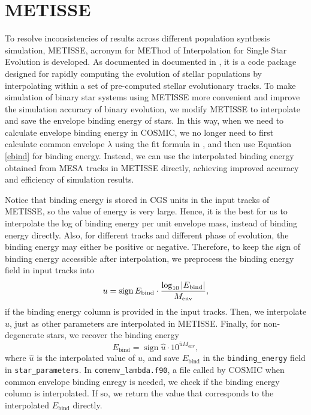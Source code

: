 \documentclass[12pt]{article}
\newcommand{\Ebind}{E_{\mathrm{bind}}}
\newcommand{\Menv}{M_{\mathrm{env}}}
\DeclareMathOperator{\sgn}{sign}
\begin{document}
\section{METISSE} \label{sec:metisse}
To resolve inconsistencies of results across different population synthesis simulation, METISSE, acronym for METhod of Interpolation for Single Star Evolution is developed. As documented in documented in \cite{Agrawal_2020,Agrawal_2023}, it is a code package designed for rapidly computing the evolution of stellar populations by interpolating within a set of pre-computed stellar evolutionary tracks. To make simulation of binary star systems using METISSE more convenient and improve the simulation accuracy of binary evolution, we modify METISSE to interpolate and save the envelope binding energy of stars. In this way, when we need to calculate envelope binding energy in COSMIC, we no longer need to first calculate common envelope $\lambda$ using the fit formula in \cite{claeys2014theoretical}, and then use Equation \ref{ebind} for binding energy. Instead, we can use the interpolated binding energy obtained from MESA tracks in METISSE directly, achieving improved accuracy and efficiency of simulation results.

Notice that binding energy is stored in CGS units in the input tracks of METISSE, so the value of energy is very large. Hence, it is the best for us to interpolate the log of binding energy per unit envelope mass, instead of binding energy directly. Also, for different tracks and different phase of evolution, the binding energy may either be positive or negative. Therefore, to keep the sign of binding energy accessible after interpolation, we preprocess the binding energy field in input tracks into
\begin{equation}
  u = \sgn{\Ebind} \cdot \frac{\log_{10} \abs{\Ebind}}{\Menv},
\end{equation}
if the binding energy column is provided in the input tracks. Then, we interpolate $u$, just as other parameters are interpolated in METISSE. Finally, for non-degenerate stars, we recover the binding energy
\begin{equation}
  \Ebind = \sgn{\hat u} \cdot 10^{\hat u \Menv},
\end{equation}
where $\hat u$ is the interpolated value of $u$, and save $\Ebind$ in the \verb|binding_energy| field in \verb|star_parameters|. In \verb|comenv_lambda.f90|, a file called by COSMIC when common envelope binding enregy is needed, we check if the binding energy column is interpolated. If so, we return the value that corresponds to the interpolated $\Ebind$ directly.
\end{document}
